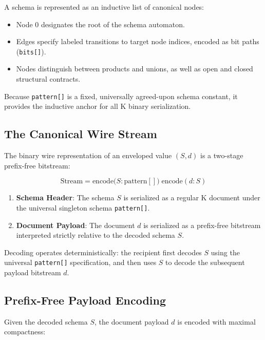 \documentclass[11pt,a4paper]{article}
\begin{document}
A schema is represented as an inductive list of canonical nodes:
\begin{itemize}
  \item Node 0 designates the root of the schema automaton.
  \item Edges specify labeled transitions to target node indices, encoded as bit paths (\lstinline|bits[]|).
  \item Nodes distinguish between products and unions, as well as open and closed structural contracts.
\end{itemize}

Because \lstinline|pattern[]| is a fixed, universally agreed-upon schema constant, it provides the inductive anchor for all K binary serialization.

\subsection{The Canonical Wire Stream}

The binary wire representation of an enveloped value $(S, d)$ is a two-stage prefix-free bitstream:

\begin{equation}
\text{Stream} = \text{encode}\bigl(S : \text{pattern}[]\bigr) \; \text{encode}(d : S)
\end{equation}

\begin{enumerate}
  \item \textbf{Schema Header}: The schema $S$ is serialized as a regular K document under the universal singleton schema \lstinline|pattern[]|.
  \item \textbf{Document Payload}: The document $d$ is serialized as a prefix-free bitstream interpreted strictly relative to the decoded schema $S$.
\end{enumerate}

Decoding operates deterministically: the recipient first decodes $S$ using the universal \lstinline|pattern[]| specification, and then uses $S$ to decode the subsequent payload bitstream $d$.

\subsection{Prefix-Free Payload Encoding}

Given the decoded schema $S$, the document payload $d$ is encoded with maximal compactness:
\end{document}
